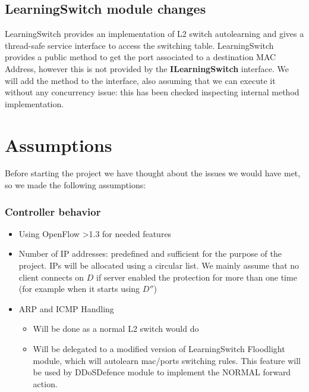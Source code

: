 \subsection{LearningSwitch module changes}
LearningSwitch provides an implementation of L2 switch autolearning and gives a thread-safe service interface to access the switching table. LearningSwitch provides a public method to get the port associated to a destination MAC Address, however this is not provided by the \textbf{ILearningSwitch} interface.
We will add the method to the interface, also assuming that we can execute it without any concurrency issue: this has been checked inspecting internal method implementation.

\section{Assumptions}
Before starting the project we have thought about the issues we would have met, so we made the following assumptions:

\subsubsection{Controller behavior}
\begin{itemize}
	\item Using OpenFlow \textgreater  1.3 for needed features
	\item Number of IP addresses: predefined and sufficient for the purpose of the project. IPs will be allocated using a circular list. We mainly assume that no client connects on \(D\) if server enabled the protection for more than one time (for example when it starts using \(D''\))
	\item ARP and ICMP Handling
		\begin{itemize}
			\item Will be done as a normal L2 switch would do
			\item Will be delegated to a modified version of LearningSwitch Floodlight module, which will autolearn mac/ports switching rules. This feature will be used by DDoSDefence module to implement the NORMAL forward action.
		\end{itemize}
\end{itemize}

